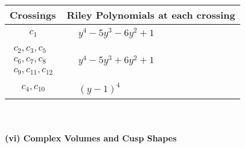 \documentclass[1p]{elsarticle_modified}
\theoremstyle{definition}
\begin{document}
\begin{tabular}{m{50pt}|m{274pt}}
Crossings & \hspace{64pt}Riley Polynomials at each crossing \\
\hline $$\begin{aligned}c_{1}\end{aligned}$$&$\begin{aligned}
&y^4-5 y^3-6 y^2+1
\end{aligned}$\\
\hline $$\begin{aligned}c_{2},c_{3},c_{5}\\c_{6},c_{7},c_{8}\\c_{9},c_{11},c_{12}\end{aligned}$$&$\begin{aligned}
&y^4-5 y^3+6 y^2+1
\end{aligned}$\\
\hline $$\begin{aligned}c_{4},c_{10}\end{aligned}$$&$\begin{aligned}
&(y-1)^4
\end{aligned}$\\
\hline
\end{tabular}\\~\\
\newpage\flushleft \textbf{(vi) Complex Volumes and Cusp Shapes}
\end{document}
